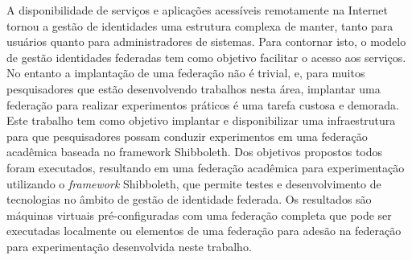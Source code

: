 %

\begin{resumo}
A disponibilidade de serviços e aplicações acessíveis remotamente na Internet tornou a gestão de identidades uma estrutura complexa de manter, tanto para usuários quanto para administradores de sistemas. Para contornar isto, o modelo de gestão identidades federadas tem como objetivo facilitar o acesso aos serviços. No entanto a implantação de uma federação não é trivial, e, para muitos pesquisadores que estão desenvolvendo trabalhos nesta área, implantar uma federação para realizar experimentos práticos é uma tarefa custosa e demorada. Este trabalho tem como objetivo implantar e disponibilizar uma infraestrutura para que pesquisadores possam conduzir experimentos em uma federação acadêmica baseada no framework Shibboleth. Dos objetivos propostos todos foram executados, resultando em uma federação acadêmica para experimentação utilizando o \textit{framework} Shibboleth, que permite testes e desenvolvimento de tecnologias no âmbito de gestão de identidade federada. Os resultados são máquinas virtuais pré-configuradas com uma federação completa que pode ser executadas localmente ou elementos de uma federação para adesão na federação para experimentação desenvolvida neste trabalho.
\end{resumo}
